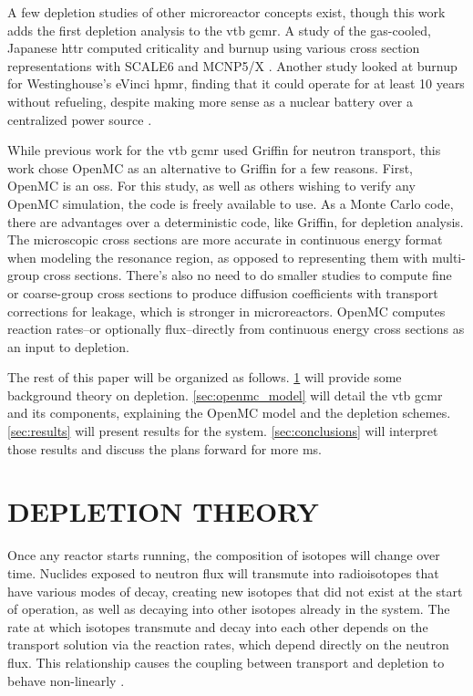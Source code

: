\documentclass[letterpaper]{physor2024}
\begin{document}
A few depletion studies of other microreactor concepts exist, though this work adds the first depletion analysis to the \gls{vtb} \gls{gcmr}. A study of the gas-cooled, Japanese \gls{httr} computed criticality and burnup using various cross section representations with SCALE6 and MCNP5/X \cite{chiang-gcmr}. Another study looked at burnup for Westinghouse's eVinci \gls{hpmr}, finding that it could operate for at least 10 years without refueling, despite making more sense as a nuclear battery over a centralized power source \cite{Hernandez-hpmr}.

While previous work for the \gls{vtb} \gls{gcmr} used Griffin for neutron transport, this work chose OpenMC as an alternative to Griffin for a few reasons. First, OpenMC is an \gls{oss}. For this study, as well as others wishing to verify any OpenMC simulation, the code is freely available to use. As a Monte Carlo code, there are advantages over a deterministic code, like Griffin, for depletion analysis. The microscopic cross sections  are more accurate in continuous energy format when modeling the resonance region, as opposed to representing them with multi-group cross sections. There's also no need to do smaller studies to compute fine or coarse-group cross sections to produce diffusion coefficients with transport corrections for leakage, which is stronger in microreactors. OpenMC computes reaction rates--or optionally flux--directly from continuous energy cross sections as an input to depletion.

The rest of this paper will be organized as follows. \cref{sec:depletion} will provide some background theory on depletion. \cref{sec:openmc_model}  will detail the \gls{vtb} \gls{gcmr} and its components, explaining the OpenMC model and the depletion schemes. \cref{sec:results} will present results for the system. \cref{sec:conclusions} will interpret those results and discuss the plans forward for more \gls{ms}.

\section{DEPLETION THEORY}\label{sec:depletion}
Once any reactor starts running, the composition of isotopes will change over time. Nuclides exposed to neutron flux will transmute into radioisotopes that have various modes of decay, creating new isotopes that did not exist at the start of operation, as well as decaying into other isotopes already in the system. The rate at which isotopes transmute and decay into each other depends on the transport solution via the reaction rates, which depend directly on the neutron flux. This relationship causes the coupling between transport and depletion to behave non-linearly \cite{romano-depletion-2021}.
\end{document}
